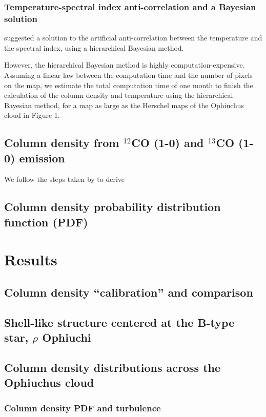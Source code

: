 \documentclass{emulateapj}
\begin{document}
\subsubsection{Temperature-spectral index anti-correlation and a Bayesian solution}

\citet{Kelly_2012} suggested a solution to the artificial anti-correlation between the temperature and the spectral index, using a hierarchical Bayesian method.

However, the hierarchical Bayesian method is highly computation-expensive. Assuming a linear law between the computation time and the number of pixels on the map, we estimate the total computation time of one month to finish the calculation of the column density and temperature using the hierarchical Bayesian method, for a map as large as the Herschel maps of the Ophiuchus cloud in Figure 1.

\subsection{Column density from $^{12}$CO (1-0) and $^{13}$CO (1-0) emission}
We follow the steps taken by \citet{Pineda_2008} to derive

\subsection{Column density probability distribution function (PDF)}


\section{Results}
\label{sec:results}

\subsection{Column density ``calibration'' and comparison}

\subsection{Shell-like structure centered at the B-type star, $\rho$ Ophiuchi}

\subsection{Column density distributions across the Ophiuchus cloud}

\subsubsection{Column density PDF and turbulence}
\end{document}
